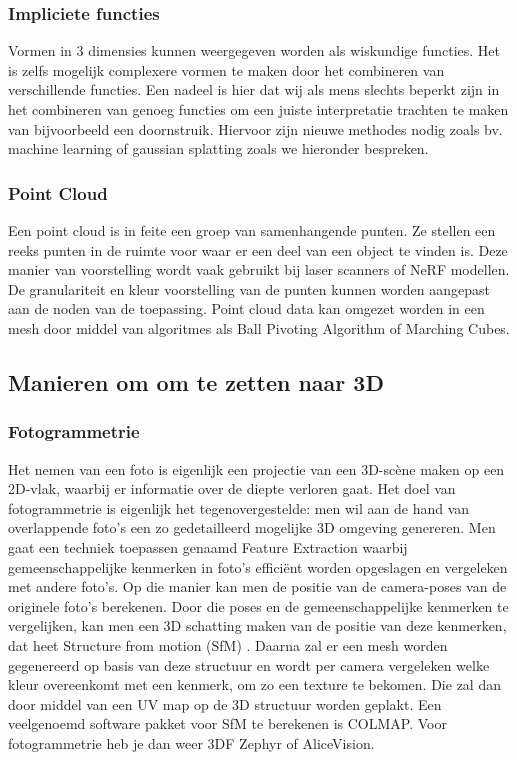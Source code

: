 \documentclass{hogent-article}
\begin{document}
\subsubsection{Impliciete functies}

Vormen in 3 dimensies kunnen weergegeven worden als wiskundige functies. Het is zelfs mogelijk complexere vormen te maken door het combineren van verschillende functies. Een nadeel is hier dat wij als mens slechts beperkt zijn in het combineren van genoeg functies om een juiste interpretatie trachten te maken van bijvoorbeeld een doornstruik.  Hiervoor zijn nieuwe methodes nodig zoals bv.  machine learning  of gaussian splatting zoals we hieronder bespreken. \autocite{Tancik2023}

\subsubsection{Point Cloud}

Een point cloud is in feite een groep van samenhangende punten. Ze stellen een reeks punten in de ruimte voor waar er een deel van een object te vinden is. Deze manier van voorstelling wordt vaak gebruikt bij laser scanners of NeRF modellen. De granulariteit en kleur voorstelling van de punten kunnen worden aangepast aan de noden van de toepassing. 
Point cloud data kan omgezet worden in een mesh door middel van algoritmes als Ball Pivoting Algorithm of Marching Cubes. \autocite{Fisher2014}

\subsection{Manieren om om te zetten naar 3D}

\subsubsection{Fotogrammetrie}

Het nemen van een foto is eigenlijk een projectie van een 3D-scène maken op een 2D-vlak, waarbij er informatie over de diepte verloren gaat. Het doel van fotogrammetrie is eigenlijk het tegenovergestelde: men wil aan de hand van overlappende foto’s een zo gedetailleerd mogelijke 3D omgeving genereren. \autocite{FormLabs}
Men gaat een techniek toepassen genaamd Feature Extraction waarbij gemeenschappelijke kenmerken in foto’s efficiënt worden opgeslagen en vergeleken met andere foto’s. Op die manier kan men de positie van de camera-poses van de originele foto’s berekenen. Door die poses en de gemeenschappelijke kenmerken te vergelijken, kan men een 3D schatting maken van de positie van deze kenmerken, dat heet Structure from motion (SfM) \autocite{Schonberger2016}. Daarna zal er een mesh worden gegenereerd op basis van deze structuur en wordt per camera vergeleken welke kleur overeenkomt met een kenmerk, om zo een texture te bekomen. Die zal dan door middel van een UV map op de 3D structuur worden geplakt. Een veelgenoemd software pakket voor SfM te berekenen is COLMAP. Voor fotogrammetrie heb je dan weer 3DF Zephyr of AliceVision. 
\end{document}
